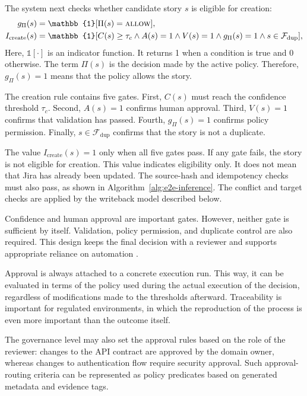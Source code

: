 \documentclass[pdflatex,sn-basic]{sn-jnl}
\begin{document}
The system next checks whether candidate story $s$ is eligible for creation:
\begin{equation}
\begin{aligned}
g_{\Pi}(s) ={}& \mathbb{1}[\Pi(s)=\textsc{allow}],\\
I_{\mathrm{create}}(s) ={}&
\mathbb{1}[C(s)\ge\tau_c \land A(s)=1 \land V(s)=1 \land g_{\Pi}(s)=1 \land s\in\mathcal{F}_{\mathrm{dup}}],
\end{aligned}
\end{equation}
Here, $\mathbb{1}[\cdot]$ is an indicator function. It returns 1 when a condition is true and 0 otherwise. The term $\Pi(s)$ is the decision made by the active policy. Therefore, $g_{\Pi}(s)=1$ means that the policy allows the story.

The creation rule contains five gates. First, $C(s)$ must reach the confidence threshold $\tau_c$. Second, $A(s)=1$ confirms human approval. Third, $V(s)=1$ confirms that validation has passed. Fourth, $g_{\Pi}(s)=1$ confirms policy permission. Finally, $s\in\mathcal{F}_{\mathrm{dup}}$ confirms that the story is not a duplicate.

The value $I_{\mathrm{create}}(s)=1$ only when all five gates pass. If any gate fails, the story is not eligible for creation. This value indicates eligibility only. It does not mean that Jira has already been updated. The source-hash and idempotency checks must also pass, as shown in Algorithm~\ref{alg:e2e-inference}. The conflict and target checks are applied by the writeback model described below.

Confidence and human approval are important gates. However, neither gate is sufficient by itself. Validation, policy permission, and duplicate control are also required. This design keeps the final decision with a reviewer and supports appropriate reliance on automation \citep{R56,R75}.

Approval is always attached to a concrete execution run. This way, it can be evaluated in terms of the policy used during the actual execution of the decision, regardless of modifications made to the thresholds afterward. Traceability is important for regulated environments, in which the reproduction of the process is even more important than the outcome itself.

The governance level may also set the approval rules based on the role of the reviewer: changes to the API contract are approved by the domain owner, whereas changes to authentication flow require security approval. Such approval-routing criteria can be represented as policy predicates based on generated metadata and evidence tags.
\end{document}

